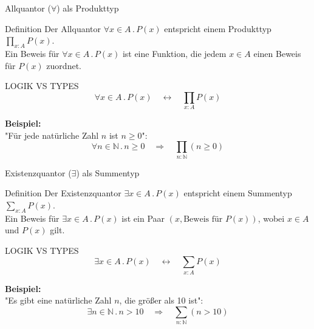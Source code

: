 \documentclass{beamer}
\begin{document}
\begin{frame}{Allquantor (\(\forall\)) als Produkttyp}
    \begin{block}{Definition}
        Der Allquantor \( \forall x \in A \, . \, P(x) \) entspricht einem Produkttyp \( \prod_{x : A} P(x) \). \\
        Ein Beweis für \( \forall x \in A \, . \, P(x) \) ist eine Funktion, die jedem \( x \in A \) einen Beweis für \( P(x) \) zuordnet.
    \end{block}

    \begin{block}{LOGIK VS TYPES}
        \[
        \forall x \in A \, . \, P(x) \quad \leftrightarrow \quad \prod_{x : A} P(x)
        \]
    \end{block}

    \textbf{Beispiel:} \\
    "Für jede natürliche Zahl \( n \) ist \( n \geq 0 \)":
    \[
    \forall n \in \mathbb{N} \, . \, n \geq 0 \quad \Rightarrow \quad \prod_{n : \mathbb{N}} (n \geq 0)
    \]
\end{frame}

\begin{frame}{Existenzquantor (\(\exists\)) als Summentyp}
    \begin{block}{Definition}
        Der Existenzquantor \( \exists x \in A \, . \, P(x) \) entspricht einem Summentyp \( \sum_{x : A} P(x) \). \\
        Ein Beweis für \( \exists x \in A \, . \, P(x) \) ist ein Paar \((x, \text{Beweis für } P(x))\), wobei \( x \in A \) und \( P(x) \) gilt.
    \end{block}

    \begin{block}{LOGIK VS TYPES}
        \[
        \exists x \in A \, . \, P(x) \quad \leftrightarrow \quad \sum_{x : A} P(x)
        \]
    \end{block}

    \textbf{Beispiel:} \\
    "Es gibt eine natürliche Zahl \( n \), die größer als 10 ist":
    \[
    \exists n \in \mathbb{N} \, . \, n > 10 \quad \Rightarrow \quad \sum_{n : \mathbb{N}} (n > 10)
    \]
\end{frame}
\end{document}
